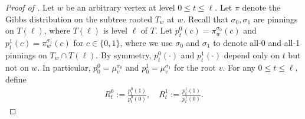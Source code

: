 \documentclass[11pt]{amsart}
\newcommand{\defeq}{:=}
\theoremstyle{definition}
\theoremstyle{remark}
\begin{document}
\begin{proof}[Proof of ]
Let $w$ be an arbitrary vertex at level $0 \leq t \leq \ell$. 
Let $\pi$ denote the Gibbs distribution on the subtree rooted $T_w$ at $w$.
Recall that $\sigma_0,\sigma_1$ are pinnings on $T(\ell)$, where $T(\ell)$ is level $\ell$ of $T$.
Let $p^0_t(c) = \pi^{\sigma_0}_w(c)$ and $p^1_t(c) = \pi^{\sigma_1}_w(c)$ for $c \in \{0,1\}$, where we use $\sigma_{0}$ and $\sigma_1$ to denote all-0 and all-1 pinnings on $T_w \cap T(\ell)$.  By symmetry, $p^0_t(\cdot)$ and $p^1_t(\cdot)$ depend only on $t$ but not on $w$. In particular, $p^0_0 = \mu_v^{\sigma_0}$ and $p^1_0 = \mu_v^{\sigma_1}$ for the root $v$. For any $0 \leq t \leq \ell$, define
\begin{align*}
	R^0_t \defeq \frac{p^0_t(1)}{p^0_t(0)}, \quad R^1_t \defeq \frac{p^1_t(1)}{p^1_t(0)}.
\end{align*}


\end{proof}
\end{document}
